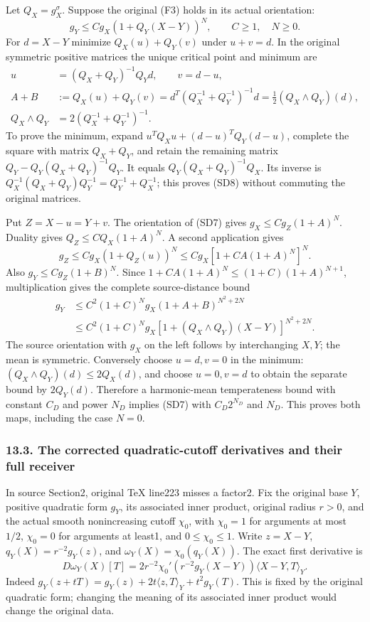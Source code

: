 \documentclass[
  11pt,
]{article}
\begin{document}
Let \(Q_X=g_X^\sigma\). Suppose the original (F3) holds in its actual
orientation: \[
 g_Y\le Cg_X(1+Q_Y(X-Y))^N,
 \qquad C\ge1,\quad N\ge0.
 \tag{SD7}
\] For \(d=X-Y\) minimize \(Q_X(u)+Q_Y(v)\) under \(u+v=d\). In the
original symmetric positive matrices the unique critical point and
minimum are \[
 \begin{aligned}
 u&=(Q_X+Q_Y)^{-1}Q_Yd,\qquad v=d-u,\\
 A+B&:=Q_X(u)+Q_Y(v)
 =d^T(Q_X^{-1}+Q_Y^{-1})^{-1}d
 =\tfrac12(Q_X\wedge Q_Y)(d),\\
 Q_X\wedge Q_Y&=2(Q_X^{-1}+Q_Y^{-1})^{-1}.
 \end{aligned}
 \tag{SD8}
\] To prove the minimum, expand \(u^TQ_Xu+(d-u)^TQ_Y(d-u)\), complete
the square with matrix \(Q_X+Q_Y\), and retain the remaining matrix
\(Q_Y-Q_Y(Q_X+Q_Y)^{-1}Q_Y\). It equals \(Q_Y(Q_X+Q_Y)^{-1}Q_X\). Its
inverse is \(Q_X^{-1}(Q_X+Q_Y)Q_Y^{-1}=Q_Y^{-1}+Q_X^{-1}\); this proves
(SD8) without commuting the original matrices.

Put \(Z=X-u=Y+v\). The orientation of (SD7) gives
\(g_X\le Cg_Z(1+A)^N\). Duality gives \(Q_Z\le C Q_X(1+A)^N\). A second
application gives \[
 g_Z\le Cg_X(1+Q_Z(u))^N
 \le Cg_X[1+CA(1+A)^N]^N.
\] Also \(g_Y\le Cg_Z(1+B)^N\). Since
\(1+CA(1+A)^N\le(1+C)(1+A)^{N+1}\), multiplication gives the complete
source-distance bound \[
 \begin{aligned}
 g_Y
 &\le C^2(1+C)^N g_X(1+A+B)^{N^2+2N}\\
 &\le C^2(1+C)^N g_X
       [1+(Q_X\wedge Q_Y)(X-Y)]^{N^2+2N}.
 \end{aligned}
 \tag{SD9}
\] The source orientation with \(g_X\) on the left follows by
interchanging \(X,Y\); the mean is symmetric. Conversely choose
\(u=d,v=0\) in the minimum: \((Q_X\wedge Q_Y)(d)\le2Q_X(d)\), and choose
\(u=0,v=d\) to obtain the separate bound by \(2Q_Y(d)\). Therefore a
harmonic-mean temperateness bound with constant \(C_D\) and power
\(N_D\) implies (SD7) with \(C_D2^{N_D}\) and \(N_D\). This proves both
maps, including the case \(N=0\).

\subsubsection{13.3. The corrected quadratic-cutoff derivatives and
their full
receiver}\label{the-corrected-quadratic-cutoff-derivatives-and-their-full-receiver}

In source Section2, original TeX line223 misses a factor2. Fix the
original base \(Y\), positive quadratic form \(g_Y\), its associated
inner product, original radius \(r>0\), and the actual smooth
nonincreasing cutoff \(\chi_0\), with \(\chi_0=1\) for arguments at most
\(1/2\), \(\chi_0=0\) for arguments at least1, and \(0\le\chi_0\le1\).
Write \(z=X-Y\), \(q_Y(X)=r^{-2}g_Y(z)\), and
\(\omega_Y(X)=\chi_0(q_Y(X))\). The exact first derivative is \[
 D\omega_Y(X)[T]
 =2r^{-2}\chi_0'(r^{-2}g_Y(X-Y))\langle X-Y,T\rangle_Y.
 \tag{SD10}
\] Indeed \(g_Y(z+tT)=g_Y(z)+2t\langle z,T\rangle_Y+t^2g_Y(T)\). This is
fixed by the original quadratic form; changing the meaning of its
associated inner product would change the original data.
\end{document}
